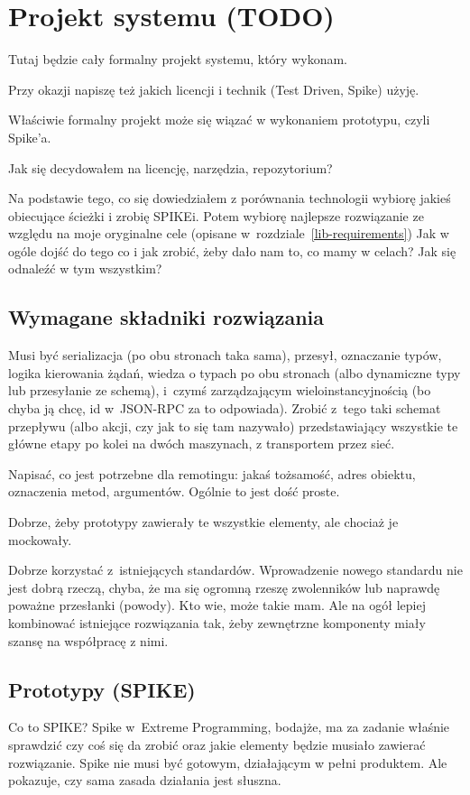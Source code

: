 \chapter{Projekt systemu (TODO)}
Tutaj będzie cały formalny projekt systemu, który wykonam.

Przy okazji napiszę też jakich licencji i technik (Test Driven, Spike) użyję.

Właściwie formalny projekt może się wiązać w wykonaniem prototypu, czyli Spike'a. 

Jak się decydowałem na licencję, narzędzia, repozytorium?

Na podstawie tego, co się dowiedziałem z porównania technologii wybiorę jakieś obiecujące ścieżki i zrobię SPIKEi. Potem wybiorę najlepsze rozwiązanie ze względu na moje oryginalne cele (opisane w~rozdziale~\ref{lib-requirements})
Jak w ogóle dojść do tego  co i jak zrobić, żeby dało nam to, co mamy w celach? Jak się odnaleźć w tym wszystkim?



\section{Wymagane składniki rozwiązania}
Musi być serializacja (po obu stronach taka sama), przesył, oznaczanie typów, logika kierowania żądań, wiedza o typach po obu stronach (albo dynamiczne typy lub przesyłanie ze schemą), i~czymś zarządzającym wieloinstancyjnością (bo chyba ją chcę, id w~JSON-RPC za to odpowiada).
Zrobić z~tego taki schemat przepływu (albo akcji, czy jak to się tam nazywało) przedstawiający wszystkie te główne etapy po kolei na dwóch maszynach, z transportem przez sieć.

Napisać, co jest potrzebne dla remotingu: jakaś tożsamość, adres obiektu, oznaczenia metod, argumentów. Ogólnie to jest dość proste.

Dobrze, żeby prototypy zawierały te wszystkie elementy, ale chociaż je mockowały.

Dobrze korzystać z~istniejących standardów. Wprowadzenie nowego standardu nie jest dobrą rzeczą, chyba, że ma się ogromną rzeszę zwolenników lub naprawdę poważne przesłanki (powody). Kto wie, może takie mam. Ale na ogół lepiej kombinować istniejące rozwiązania tak, żeby zewnętrzne komponenty miały szansę na współpracę z nimi.



\section{Prototypy (SPIKE)}
Co to SPIKE? Spike w~Extreme Programming, bodajże, ma za zadanie właśnie sprawdzić czy coś się da zrobić oraz jakie elementy będzie musiało zawierać rozwiązanie.
Spike nie musi być gotowym, działającym w pełni produktem. Ale pokazuje, czy sama zasada działania jest słuszna.

